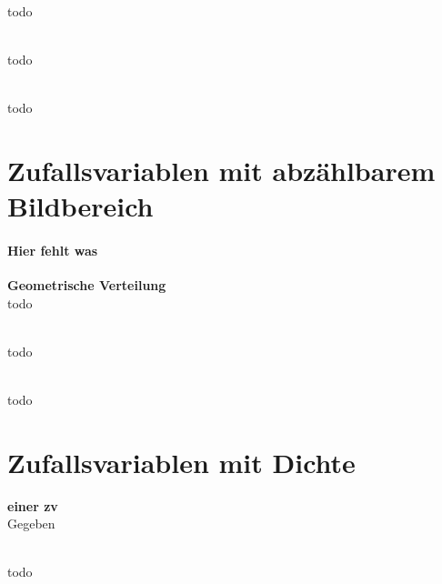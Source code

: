 \begin{bsp}   \\
todo  %
\end{bsp}

\begin{lem}   \\
todo  %
\end{lem}

\begin{lem}   \\
todo  %
\end{lem}

\section{Zufallsvariablen mit abzählbarem Bildbereich}\label{sec:zufallsvariablen-mit-abzahlbarem-bildbereich}

\paragraph{Hier fehlt was} %

\begin{bsp} \textbf{Geometrische Verteilung}   \\
todo  %
\end{bsp}

\begin{bem}   \\
todo  %
\end{bem}

\begin{lem}   \\
todo  %
\end{lem}

\section{Zufallsvariablen mit Dichte}\label{sec:zufallsvariablen-mit-dichte}
\begin{defi}
    \textbf{\dichte einer \gls{zv}}    \\
    Gegeben \dichte {} \\
\end{defi}

\begin{bem}   \\
todo  %
\end{bem}

